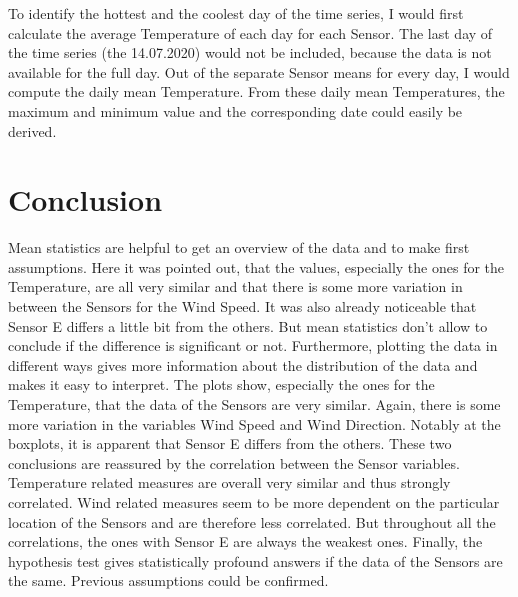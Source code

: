 \documentclass{article}
\begin{document}
To identify the hottest and the coolest day of the time series, I would first calculate the average Temperature of each day for each Sensor.  The last day of the time series (the 14.07.2020) would not be included, because the data is not available for the full day. Out of the separate Sensor means for every day, I would compute the daily mean Temperature. From these daily mean Temperatures, the maximum and minimum value and the corresponding date could easily be derived.

\section{Conclusion}

Mean statistics are helpful to get an overview of the data and to make first assumptions. Here it was pointed out, that the values, especially the ones for the Temperature, are all very similar and that there is some more variation in between the Sensors for the Wind Speed. It was also already noticeable that Sensor E differs a little bit from the others. But mean statistics don’t allow to conclude if the difference is significant or not. Furthermore, plotting the data in different ways gives more information about the distribution of the data and makes it easy to interpret. The plots show, especially the ones for the Temperature, that the data of the Sensors are very similar. Again, there is some more variation in the variables Wind Speed and Wind Direction. Notably at the boxplots, it is apparent that Sensor E differs from the others. These two conclusions are reassured by the correlation between the Sensor variables. Temperature related measures are overall very similar and thus strongly correlated. Wind related measures seem to be more dependent on the particular location of the Sensors and are therefore less correlated. But throughout all the correlations, the ones with Sensor E are always the weakest ones. Finally, the hypothesis test gives statistically profound answers if the data of the Sensors are the same. Previous assumptions could be confirmed.




\end{document}
